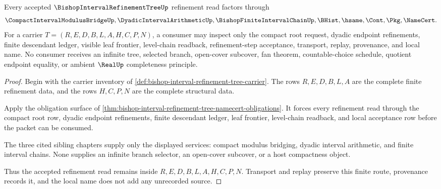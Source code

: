 \begin{theorem}
\label{thm:bishop-interval-refinement-tree-refinement-nonescape}
Every accepted $\BishopIntervalRefinementTreeUp$ refinement read factors through
$$
\CompactIntervalModulusBridgeUp,\DyadicIntervalArithmeticUp,\BishopFiniteIntervalChainUp,\BHist,\hsame,\Cont,\Pkg,\NameCert .
$$
For a carrier $T=(R,E,D,B,L,A,H,C,P,N)$, a consumer may inspect only the compact root request, dyadic endpoint refinements, finite descendant ledger, visible leaf frontier, level-chain readback, refinement-step acceptance, transport, replay, provenance, and local name. No consumer receives an infinite tree, selected branch, open-cover subcover, fan theorem, countable-choice schedule, quotient endpoint equality, or ambient $\RealUp$ completeness principle.
\end{theorem}
\begin{proof}
Begin with the carrier inventory of \autoref{def:bishop-interval-refinement-tree-carrier}. The rows $R,E,D,B,L,A$ are the complete finite refinement data, and the rows $H,C,P,N$ are the complete structural data.

Apply the obligation surface of \autoref{thm:bishop-interval-refinement-tree-namecert-obligations}. It forces every refinement read through the compact root row, dyadic endpoint refinements, finite descendant ledger, leaf frontier, level-chain readback, and local acceptance row before the packet can be consumed.

The three cited sibling chapters supply only the displayed services: compact modulus bridging, dyadic interval arithmetic, and finite interval chains. None supplies an infinite branch selector, an open-cover subcover, or a host compactness object.

Thus the accepted refinement read remains inside $R,E,D,B,L,A,H,C,P,N$. Transport and replay preserve this finite route, provenance records it, and the local name does not add any unrecorded source.
\end{proof}



